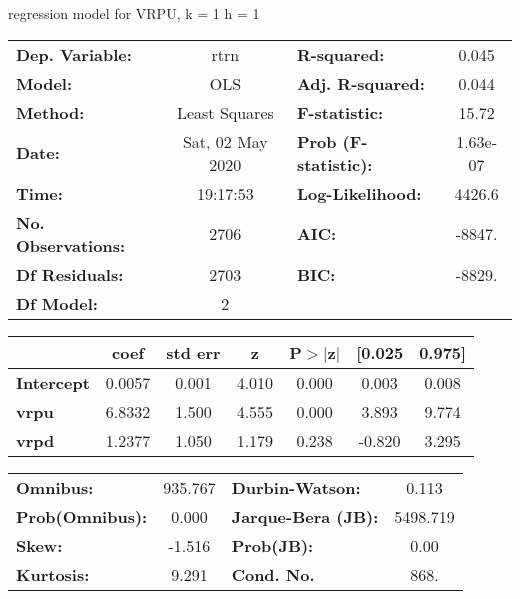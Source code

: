 regression model for VRPU, k = 1 h = 1\begin{center}
\begin{tabular}{lclc}
\toprule
\textbf{Dep. Variable:}    &       rtrn       & \textbf{  R-squared:         } &     0.045   \\
\textbf{Model:}            &       OLS        & \textbf{  Adj. R-squared:    } &     0.044   \\
\textbf{Method:}           &  Least Squares   & \textbf{  F-statistic:       } &     15.72   \\
\textbf{Date:}             & Sat, 02 May 2020 & \textbf{  Prob (F-statistic):} &  1.63e-07   \\
\textbf{Time:}             &     19:17:53     & \textbf{  Log-Likelihood:    } &    4426.6   \\
\textbf{No. Observations:} &        2706      & \textbf{  AIC:               } &    -8847.   \\
\textbf{Df Residuals:}     &        2703      & \textbf{  BIC:               } &    -8829.   \\
\textbf{Df Model:}         &           2      & \textbf{                     } &             \\
\bottomrule
\end{tabular}
\begin{tabular}{lcccccc}
                   & \textbf{coef} & \textbf{std err} & \textbf{z} & \textbf{P$> |$z$|$} & \textbf{[0.025} & \textbf{0.975]}  \\
\midrule
\textbf{Intercept} &       0.0057  &        0.001     &     4.010  &         0.000        &        0.003    &        0.008     \\
\textbf{vrpu}      &       6.8332  &        1.500     &     4.555  &         0.000        &        3.893    &        9.774     \\
\textbf{vrpd}      &       1.2377  &        1.050     &     1.179  &         0.238        &       -0.820    &        3.295     \\
\bottomrule
\end{tabular}
\begin{tabular}{lclc}
\textbf{Omnibus:}       & 935.767 & \textbf{  Durbin-Watson:     } &    0.113  \\
\textbf{Prob(Omnibus):} &   0.000 & \textbf{  Jarque-Bera (JB):  } & 5498.719  \\
\textbf{Skew:}          &  -1.516 & \textbf{  Prob(JB):          } &     0.00  \\
\textbf{Kurtosis:}      &   9.291 & \textbf{  Cond. No.          } &     868.  \\
\bottomrule
\end{tabular}
\end{center}

